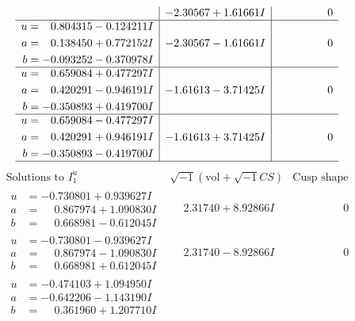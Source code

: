 \documentclass[1p]{elsarticle_modified}
\theoremstyle{definition}
\newcommand{\I}{\sqrt{-1}}
\begin{document}
$$\begin{array}{c|c|c}
 & -2.30567 + 1.61661 I & \phantom{-0.000000 } 0 \\ \hline\begin{aligned}
u &= \phantom{-}0.804315 - 0.124211 I \\
a &= \phantom{-}0.138450 + 0.772152 I \\
b &= -0.093252 - 0.370978 I\end{aligned}
 & -2.30567 - 1.61661 I & \phantom{-0.000000 } 0 \\ \hline\begin{aligned}
u &= \phantom{-}0.659084 + 0.477297 I \\
a &= \phantom{-}0.420291 - 0.946191 I \\
b &= -0.350893 + 0.419700 I\end{aligned}
 & -1.61613 - 3.71425 I & \phantom{-0.000000 } 0 \\ \hline\begin{aligned}
u &= \phantom{-}0.659084 - 0.477297 I \\
a &= \phantom{-}0.420291 + 0.946191 I \\
b &= -0.350893 - 0.419700 I\end{aligned}
 & -1.61613 + 3.71425 I & \phantom{-0.000000 } 0\\
 \hline 
 \end{array}$$\newpage$$\begin{array}{c|c|c}  
\text{Solutions to }I^u_{1}& \I (\text{vol} + \sqrt{-1}CS) & \text{Cusp shape}\\
 \hline 
\begin{aligned}
u &= -0.730801 + 0.939627 I \\
a &= \phantom{-}0.867974 + 1.090830 I \\
b &= \phantom{-}0.668981 - 0.612045 I\end{aligned}
 & \phantom{-}2.31740 + 8.92866 I & \phantom{-0.000000 } 0 \\ \hline\begin{aligned}
u &= -0.730801 - 0.939627 I \\
a &= \phantom{-}0.867974 - 1.090830 I \\
b &= \phantom{-}0.668981 + 0.612045 I\end{aligned}
 & \phantom{-}2.31740 - 8.92866 I & \phantom{-0.000000 } 0 \\ \hline\begin{aligned}
u &= -0.474103 + 1.094950 I \\
a &= -0.642206 - 1.143190 I \\
b &= \phantom{-}0.361960 + 1.207710 I\end{aligned}

\end{array}$$
\end{document}
